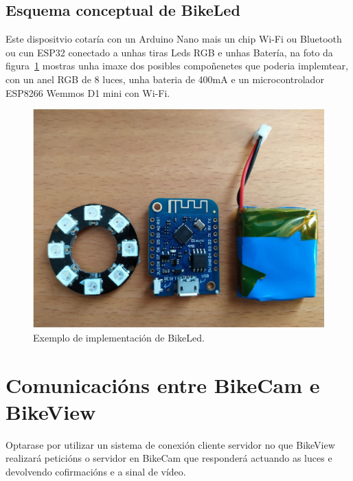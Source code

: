 \subsection{Esquema conceptual de BikeLed}

Este dispositvio cotaría con un Arduino Nano mais un chip Wi-Fi ou Bluetooth ou cun ESP32 conectado a unhas tiras Leds RGB e unhas Batería, na foto da figura~\ref{fig:bikeled} mostras unha imaxe dos posibles compoñenetes que poderia implemtear, con un anel RGB de 8 luces, unha bateria de 400mA e un microcontrolador ESP8266 Wemmos D1 mini con Wi-Fi.
\begin{figure}[tbp]
  \centering
  \includegraphics[scale=0.3]{imaxes/bikeled.jpg}
  \caption{Exemplo de implementación de BikeLed.}
  \label{fig:bikeled}
\end{figure}

\section{Comunicacións entre BikeCam e BikeView}
Optarase por utilizar un sistema de conexión cliente servidor no que BikeView realizará peticións o servidor en BikeCam que responderá actuando as luces e devolvendo cofirmacións e a sinal de vídeo.



